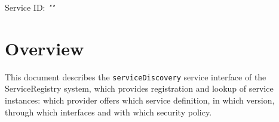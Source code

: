 \documentclass[a4paper]{arrowhead}
\begin{document}
\sloppy

\ArrowheadSetup

\begin{center}
  \vspace*{1cm}
  \huge{\arrowtitle}

  \vspace*{0.2cm}
  \LARGE{\arrowtype}
  \vspace*{1cm}

  \Large{Service ID: \textit{"\arrowid"}}

  \vspace*{\fill}


  \vspace*{1cm}
  \vspace*{\fill}

  \begin{abstract}
    This document describes the HTTP/1.1 protocol with TLS payload security and JSON payload encoding variant of the \texttt{serviceDiscovery} service of the ServiceRegistry system.
  \end{abstract}

  \vspace*{1cm}
\end{center}

\newpage

\tableofcontents
\newpage

\section{Overview}
\label{sec:overview}

This document describes the \texttt{serviceDiscovery} service interface of the ServiceRegistry system, which provides registration and lookup of service instances: which provider offers which service definition, in which version, through which interfaces and with which security policy.
\end{document}
